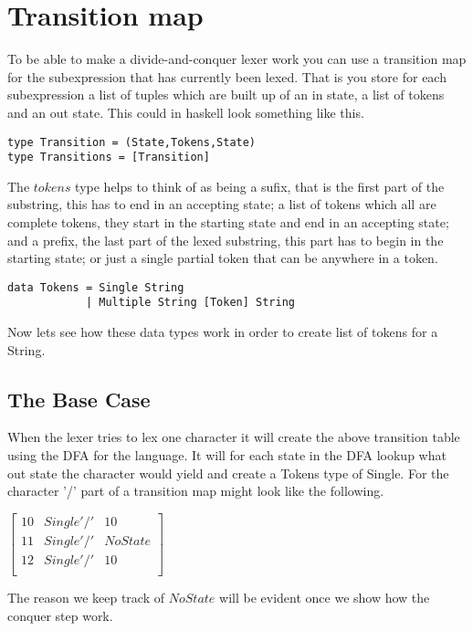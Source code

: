 \section{Transition map}
To be able to make a divide-and-conquer lexer work you can use a transition map
for the subexpression that has currently been lexed. That is you store for each
subexpression a list of tuples which are built up of an in state, a list of
tokens and an out state. This could in haskell look something like this.
\begin{verbatim}
type Transition = (State,Tokens,State)
type Transitions = [Transition]
\end{verbatim}
The $tokens$ type helps to think of as being a sufix, that is the first part of
the substring, this has to end in an accepting state; a list of tokens which all
are complete tokens, they start in the starting state and end in an accepting
state; and a prefix, the last part of the lexed substring, this part has
to begin in the starting state; or just a single partial token that can be
anywhere in a token.
\begin{verbatim}
data Tokens = Single String
            | Multiple String [Token] String
\end{verbatim}
Now lets see how these data types work in order to create list of tokens for a
String.
\subsection{The Base Case}
When the lexer tries to lex one character it will create the above transition
table using the DFA for the language. It will for each state in the DFA lookup
what out state the character would yield and create a Tokens type of Single.
For the character '/' part of a transition map might look like the following.
\begin{center}
$\left[\begin{array}{ccc}
10&Single '/'&10\\
11&Single '/'&NoState\\
12&Single '/'&10\\
\end{array}\right]$
\end{center}
The reason we keep track of $NoState$ will be evident once we show how the
conquer step work.
